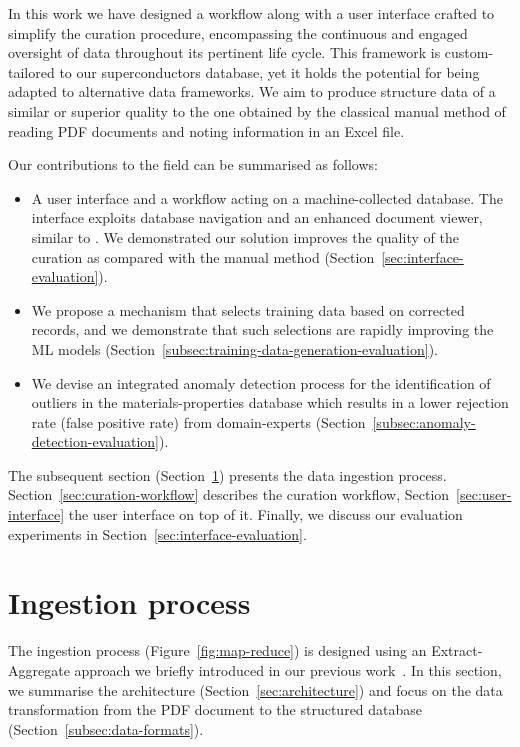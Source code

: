 \documentclass[a4paper]{article}
\begin{document}
In this work we have designed a workflow along with a user interface crafted to simplify the curation procedure, encompassing the continuous and engaged oversight of data throughout its pertinent life cycle. 
This framework is custom-tailored to our superconductors database, yet it holds the potential for being adapted to alternative data frameworks.
We aim to produce structure data of a similar or superior quality to the one obtained by the classical manual method of reading PDF documents and noting information in an Excel file.

Our contributions to the field can be summarised as follows:
\begin{itemize}
    \item A user interface and a workflow acting on a machine-collected database. The interface exploits database navigation and an enhanced document viewer, similar to \cite{wang2022hammer}. We demonstrated our solution improves the quality of the curation as compared with the manual method (Section~\ref{sec:interface-evaluation}).
    \item We propose a mechanism that selects training data based on corrected records, and we demonstrate that such selections are rapidly improving the ML models (Section~\ref{subsec:training-data-generation-evaluation}).
    \item We devise an integrated anomaly detection process for the identification of outliers in the materials-properties database which results in a lower rejection rate (false positive rate) from domain-experts (Section~\ref{subsec:anomaly-detection-evaluation}).
\end{itemize}

The subsequent section (Section~\ref{sec:ingestion}) presents the data ingestion process.
Section~\ref{sec:curation-workflow} describes the curation workflow, Section~\ref{sec:user-interface} the user interface on top of it.
Finally, we discuss our evaluation experiments in Section~\ref{sec:interface-evaluation}. 


\section{Ingestion process}
\label{sec:ingestion}

The ingestion process (Figure~\ref{fig:map-reduce}) is designed using an Extract-Aggregate approach we briefly introduced in our previous work~\cite{lfoppiano2023automatic}. 
In this section, we summarise the architecture (Section~\ref{sec:architecture}) and focus on the data transformation from the PDF document to the structured database (Section~\ref{subsec:data-formats}).
\end{document}
